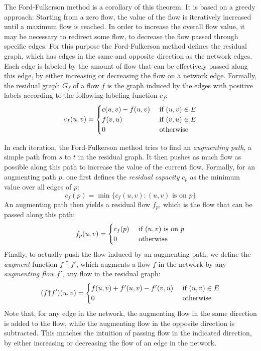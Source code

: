 \documentclass[smallcondensed]{svjour3}     %
\begin{document}
The Ford-Fulkerson method is a corollary of this theorem. It is based on a greedy approach: Starting from a zero flow, the value of the flow is iteratively increased until a maximum flow is reached. In order to increase the overall flow value, it may be necessary to redirect some flow, \ie to decrease the flow passed through specific edges. For this purpose the Ford-Fulkerson method defines the residual graph, which has edges in the same and opposite direction as the network edges.
Each edge is labeled by the amount of flow that can be effectively passed along this edge, by either increasing or decreasing the flow on a network edge.
Formally, the residual graph $G_f$ of a flow $f$ is the graph induced by the 
edges with positive labels according to the following labeling function $c_f$:
\[ c_f (u, v) = 
  \begin{cases}
  c (u, v) - f(u, v) \hfill & \text{ if $(u, v) \in E$} \\
  f (v, u) \hfill & \text{ if $(v, u) \in E$} \\  
  0 \hfill & \text{ otherwise} \\
  \end{cases} 
\]

In each iteration, the Ford-Fulkerson method tries to find an \emph{augmenting path}, \ie a simple path from $s$ to $t$ in the residual graph.
It then pushes as much flow as possible along this path to increase the value of the current flow. 
Formally, for an augmenting path $p$, one first defines the \emph{residual capacity} $c_p$ as the minimum value over all edges of $p$:
\[c_f(p) = \min \{c_f(u, v): \text{$(u, v)$ is on  $p$}\}\]
An augmenting path then yields a residual flow $f_p$, which is the flow that can be passed along this path:
\[ f_p (u, v) = 
  \begin{cases}
  c_f(p) \hfill & \text{ if $(u, v)$ is on $p$} \\  
  0 \hfill & \text{ otherwise} \\
  \end{cases} 
\]
\newcommand{\augment}{{\mathbin\uparrow}}%
Finally, to actually push the flow induced by an augmenting path, we define the \emph{augment} function $f\augment f'$, which augments a flow $f$ in the network 
by any \emph{augmenting flow} $f'$, \ie any flow in the residual graph:
\[ (f \augment f') (u, v) = 
  \begin{cases}
  f (u, v) + f'(u, v) - f'(v, u) \hfill & \text{ if $(u, v) \in E$} \\  
  0 \hfill & \text{ otherwise} \\
  \end{cases} 
\]
Note that, for any edge in the network, the augmenting flow in the same direction is added to the flow, while the augmenting flow in the opposite direction is subtracted. 
This matches the intuition of passing flow in the indicated direction, by either increasing or decreasing the flow of an edge in the network.
\end{document}
